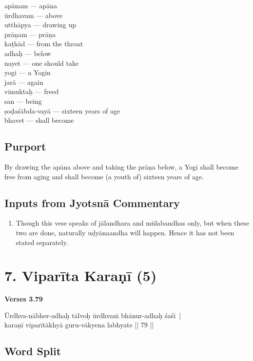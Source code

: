 \begin{multicols}{2}
apānam --- apāna\\
ūrdhavam --- above \\
utthāpya ---  drawing up \\
prāṇam ---  prāṇa\\
kaṭhād --- from the throat \\
adhaḥ ---  below \\
nayet --- one should take \\
yogi ---  a Yogin\\
jarā --- again\\
vimuktaḥ --- freed\\
san ---  being\\
ṣoḍaśābda-vayā --- sixteen years of age\\
bhavet --- shall become
\end{multicols}

\subsection*{Purport}

By drawing the apāna above and taking the prāṇa below, a Yogi shall become free from aging and shall become (a youth of) sixteen years of age.

\subsection*{Inputs from Jyotsnā Commentary}

\begin{enumerate}
\item Though this vese speaks of jālandhara and mūlabandhas only, but when these two are done, naturally uḍyānaandha will happen. Hence it has not been stated separately.
\end{enumerate}
\newpage

\section*{7. Viparīta Karaṇī (5)}

\noindent \textbf{Verses 3.79}

\begin{shloka}
Ūrdhva-nābher-adhaḥ tālvoḥ ūrdhvaṁ bhānur-adhaḥ śaśī |\\
karaṇī viparītākhyā guru-vākyena labhyate || 79 ||
\end{shloka}

\subsection*{Word Split}

